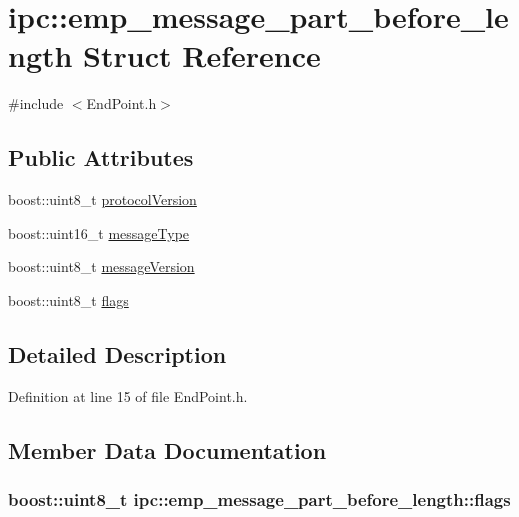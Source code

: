 \hypertarget{structipc_1_1emp__message__part__before__length}{}\section{ipc\+:\+:emp\+\_\+message\+\_\+part\+\_\+before\+\_\+length Struct Reference}
\label{structipc_1_1emp__message__part__before__length}


{\ttfamily \#include $<$End\+Point.\+h$>$}

\subsection*{Public Attributes}
\begin{DoxyCompactItemize}
\item 
boost\+::uint8\+\_\+t \hyperlink{structipc_1_1emp__message__part__before__length_a823b229981f8bf4aa504bad9eb71c8ad}{protocol\+Version}
\item 
boost\+::uint16\+\_\+t \hyperlink{structipc_1_1emp__message__part__before__length_a48e0635345c37af793a98fcef9736b2b}{message\+Type}
\item 
boost\+::uint8\+\_\+t \hyperlink{structipc_1_1emp__message__part__before__length_a79751350900a0fa719f49e8423e3eee0}{message\+Version}
\item 
boost\+::uint8\+\_\+t \hyperlink{structipc_1_1emp__message__part__before__length_ad54efa0feff8b47ece3a1f4371587ec2}{flags}
\end{DoxyCompactItemize}


\subsection{Detailed Description}


Definition at line 15 of file End\+Point.\+h.



\subsection{Member Data Documentation}
\subsubsection[{\texorpdfstring{flags}{flags}}]{\setlength{\rightskip}{0pt plus 5cm}boost\+::uint8\+\_\+t ipc\+::emp\+\_\+message\+\_\+part\+\_\+before\+\_\+length\+::flags}\hypertarget{structipc_1_1emp__message__part__before__length_ad54efa0feff8b47ece3a1f4371587ec2}{}\label{structipc_1_1emp__message__part__before__length_ad54efa0feff8b47ece3a1f4371587ec2}


